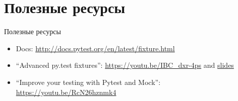 \documentclass{beamer}
\begin{document}
\section{Полезные ресурсы}
\begin{frame}[fragile]{Полезные ресурсы}
	\begin{itemize}
	\item Docs: \url{http://docs.pytest.org/en/latest/fixture.html}
	\item ``Advanced py.test fixtures'':
		\url{https://youtu.be/IBC_dxr-4ps} and
		\href{http://devork.be/talks/advanced-fixtures/advfix.html}{slides}
	\item ``Improve your testing with Pytest and Mock'':
		\url{https://youtu.be/RcN26hznmk4}
	\end{itemize}
\end{frame}
\end{document}
